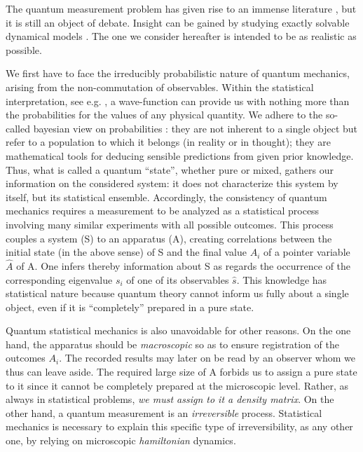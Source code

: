 \begin{multicols}{2}

The quantum measurement problem has given rise to an immense 
literature \cite{wh}, but it is still an object of debate. Insight 
can be gained by studying exactly solvable 
dynamical models \cite{models}. The one
we consider hereafter is intended to be as realistic as possible. 

We first have to face the irreducibly probabilistic
nature of quantum mechanics, arising from the non-commutation of 
observables. Within the statistical interpretation, 
see e.g.  \cite{ballentine},
a wave-function can provide us with nothing more than the probabilities 
for the values of any physical quantity. We adhere to the so-called 
bayesian view on probabilities \cite{bayes}: they are not inherent to a single 
object but refer to a population to which it belongs
(in reality or in thought); they are
mathematical tools for deducing sensible predictions from given prior
knowledge. Thus, what is called a quantum ``state'', whether pure or mixed,
gathers our information on the considered system: it does not
characterize this system by itself, but its statistical ensemble.
Accordingly, the consistency of
quantum mechanics requires a measurement to be analyzed as a statistical
process involving many similar experiments with all possible outcomes. 
This process couples a system (S) to an apparatus (A),
creating correlations between the initial state (in the above sense) of S
and the final value $A_i$ of a pointer variable $\hat{A}$ of A. One infers
thereby information about S as regards the occurrence of the corresponding
eigenvalue $s_i$ of one of its observables
$\hat{s}$. This knowledge has statistical nature because quantum
theory cannot inform us fully about a single object, even if it is 
``completely'' prepared in a pure state. 

Quantum statistical mechanics is also unavoidable for other reasons. 
On the one hand, the apparatus should be {\it macroscopic} so as to 
ensure registration of the outcomes $A_i$. The recorded results may 
later on be read by an observer whom we thus can leave aside. 
The required large size of A forbids us to assign a pure state to it
since it cannot be completely prepared at the microscopic level.
Rather, as always in statistical problems, 
{\it we must assign to it a density matrix}. 
On the other hand, a quantum measurement is an {\it irreversible} process. 
Statistical mechanics is necessary to explain this specific type of 
irreversibility, as any other one, by relying on microscopic {\it hamiltonian} 
dynamics. 


\end{multicols}
